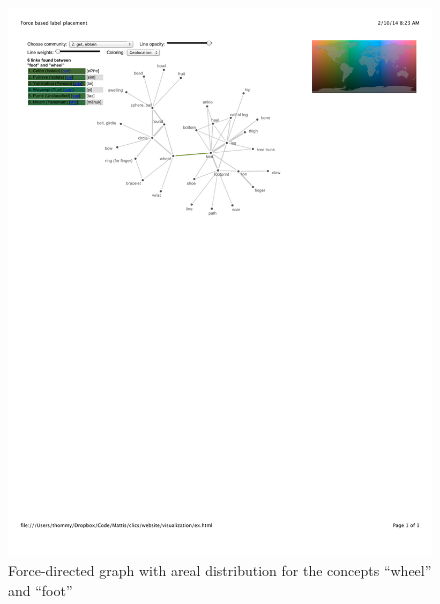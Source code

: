 \begin{figure}[htbp]
\begin{center}
\includegraphics[width=\textwidth]{img/wheelfootAreal.pdf}
\caption{Force-directed graph with areal distribution for the concepts ``wheel'' and ``foot''}
\label{WheelFootAreas}
\end{center}
\end{figure}


